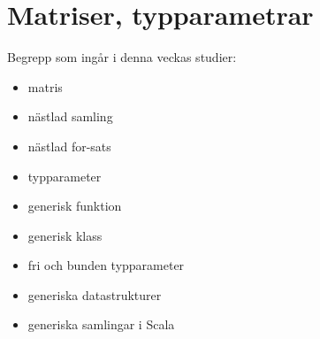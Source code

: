 \chapter{Matriser, typparametrar}\label{chapter:W08}
Begrepp som ingår i denna veckas studier:
\begin{itemize}[noitemsep,label={$\square$},leftmargin=*]
\item matris
\item nästlad samling
\item nästlad for-sats
\item typparameter
\item generisk funktion
\item generisk klass
\item fri och bunden typparameter
\item generiska datastrukturer
\item generiska samlingar i Scala\end{itemize}
